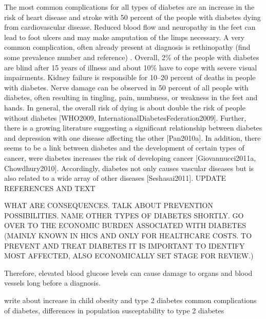 \begin{itemize}
The most common complications for all types of diabetes are an increase in the risk of heart disease and stroke with 50 percent of the people with diabetes dying from cardiovascular disease. Reduced blood flow and neuropathy in the feet can lead to foot ulcers and may make amputation of the limps necessary. A very common complication, often already present at diagnosis is rethinopathy (find some prevalence number and reference) . Overall, 2\% of the people with diabetes are blind after 15 years of illness and about 10\% have to cope with severe visual impairments. Kidney failure is responsible for 10--20 percent of deaths in people with diabetes. Nerve damage can be observed in 50 percent of all people with diabetes, often resulting in tingling, pain, numbness, or weakness in the feet and hands. In general, the overall risk of dying is about double the risk of people without diabetes [WHO2009, InternationalDiabetesFederation2009]. Further, there is a growing literature suggesting a significant relationship between diabetes and depression with one disease affecting the other [Pan2010a]. In addition, there seems to be a link between diabetes and the development of certain types of cancer, were diabetes increases the risk of developing cancer [Giovannucci2011a, Chowdhury2010]. Accordingly, diabetes not only causes vascular diseases but is also related to a wide array of other diseases [Seshasai2011]. UPDATE REFERENCES AND TEXT

WHAT ARE CONSEQUENCES. TALK ABOUT PREVENTION POSSIBILITIES. NAME OTHER TYPES OF DIABETES SHORTLY. GO OVER TO THE ECONOMIC BURDEN ASSOCIATED WITH DIABETES (MAINLY KNOWN IN HICS AND ONLY FOR HEALTHCARE COSTS. TO PREVENT AND TREAT DIABETES IT IS IMPORTANT TO IDENTIFY MOST AFFECTED, ALSO ECONOMICALLY SET STAGE FOR REVIEW.)
\end{itemize} Therefore, elevated blood glucose levels can cause damage to organs and blood vessels long before a diagnosis.

write about increase in child obesity and type 2 diabetes
common complications of diabetes, differences in population susceptability to type 2 diabetes

